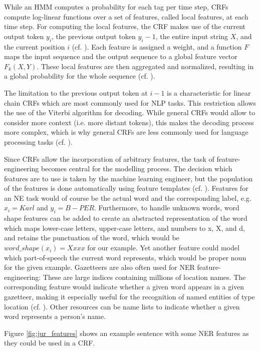 While an HMM computes a probability for each tag per time step, CRFs compute log-linear functions over a set of features, called local features, at each time step. 
For computing the local features, the CRF makes use of the current output token $y_i$, the previous output token $y_i-1$, the entire input string $X$, and the current position $i$ (cf. \cite[16]{jurafsky_2021_8}). 
Each feature is assigned a weight, and a function $F$ maps the input sequence and the output sequence to a global feature vector $F_k(X,Y)$. 
These local features are then aggregated and normalized, resulting in a global probability for the whole sequence (cf. \cite[16]{jurafsky_2021_8}). 

The limitation to the previous output token at $i-1$ is a characteristic for linear chain CRFs which are most commonly used for NLP tasks. This restriction allows the use of the Viterbi algorithm for decoding. While general CRFs would allow to consider more context (i.e. more distant tokens), this makes the decoding process more complex, which is why general CRFs are less commonly used for language processing tasks (cf. \cite[16]{jurafsky_2021_8}). 

Since CRFs allow the incorporation of arbitrary features, the task of feature-engineering becomes central for the modelling process. The decision which features are to use is taken by the machine learning engineer, but the population of the features is done automatically using feature templates (cf. \cite[16]{jurafsky_2021_8}). 
Features for an NE task would of course be the actual word and the corresponding label, e.g. $x_i = Karl$ and $y_i = B-PER$. Furthermore, to handle unknown words, word shape features can be added to create an abstracted representation of the word which maps lower-case letters, upper-case letters, and numbers to x, X, and d, and retains the punctuation of the word, which would be $word\_shape(x_i) = Xxxx$ for our example. Yet another feature could model which part-of-speech the current word represents, which would be proper noun for the given example. 
Gazetteers are also often used for NER feature-engineering: These are large indices containing millions of location names. The corresponding feature would indicate whether a given word appears in a given gazetteer, making it especially useful for the recognition of named entities of type location (cf. \cite[18]{jurafsky_2021_8}). 
Other resources can be name lists to indicate whether a given word represents a person's name. 

Figure \ref{fig:jur_features} shows an example sentence with some NER features as they could be used in a CRF. 

